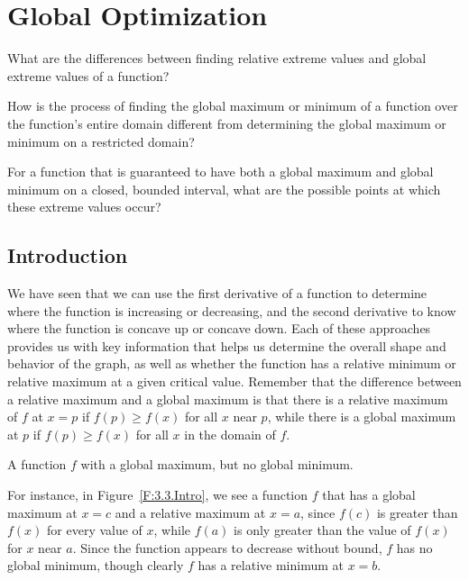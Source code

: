 \section{Global Optimization} \label{S:3.3.Optimization}

\begin{goals}
\item What are the differences between finding relative extreme values and global extreme values of a function?
\item How is the process of finding the global maximum or minimum of a function over the function's entire domain different from determining the global maximum or minimum on a restricted domain?
\item For a function that is guaranteed to have both a global maximum and global minimum on a closed, bounded interval, what are the possible points at which these extreme values occur?
\end{goals}

\subsection*{Introduction}

We have seen that we can use the first derivative of a function to determine where the function is increasing or decreasing, and the second derivative to know where the function is concave up or concave down.  Each of these approaches provides us with key information that helps us determine the overall shape and behavior of the graph, as well as whether the function has a relative minimum or relative maximum at a given critical value.  Remember that the difference between a relative maximum and a global maximum is that there is a relative maximum of $f$ at $x = p$ if $f(p) \ge f(x)$ for all $x$ near $p$, while there is a global maximum at $p$ if $f(p) \ge f(x)$ for all $x$ in the domain of $f$.  

\begin{marginfigure}[3cm] %
\caption{A function $f$ with a global maximum, but no global minimum.} \label{F:3.3.Intro}
\end{marginfigure}

For instance, in Figure~\ref{F:3.3.Intro}, we see a function $f$ that has a global maximum at $x = c$ and a relative maximum at $x = a$, since $f(c)$ is greater than $f(x)$ for every value of $x$, while $f(a)$ is only greater than the value of $f(x)$ for $x$ near $a$.  Since the function appears to decrease without bound, $f$ has no global minimum, though clearly $f$ has a relative minimum at $x = b$.

